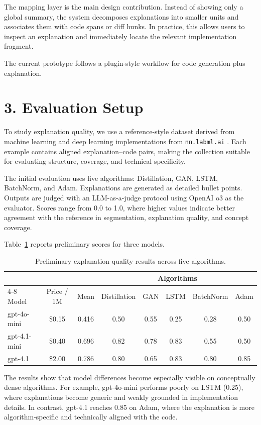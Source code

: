 \documentclass[11pt]{article}
\begin{document}
The mapping layer is the main design contribution. Instead of showing only a global summary, the system decomposes explanations into smaller units and associates them with code spans or diff hunks. In practice, this allows users to inspect an explanation and immediately locate the relevant implementation fragment.

The current prototype follows a plugin-style workflow for code generation plus explanation.

\section*{3. Evaluation Setup}
To study explanation quality, we use a reference-style dataset derived from machine learning and deep learning implementations from \texttt{nn.labml.ai} \cite{labml}. Each example contains aligned explanation--code pairs, making the collection suitable for evaluating structure, coverage, and technical specificity.

The initial evaluation uses five algorithms: Distillation, GAN, LSTM, BatchNorm, and Adam. Explanations are generated as detailed bullet points. Outputs are judged with an LLM-as-a-judge protocol using OpenAI o3 as the evaluator. Scores range from 0.0 to 1.0, where higher values indicate better agreement with the reference in segmentation, explanation quality, and concept coverage.

Table~\ref{tab:results} reports preliminary scores for three models.

\begin{table}[h]
\centering
\scriptsize
\begin{tabular}{lccccccc}
\toprule
& & & \multicolumn{5}{c}{Algorithms} \\
\cmidrule(lr){4-8}
Model & Price / 1M & Mean & Distillation & GAN & LSTM & BatchNorm & Adam \\
\midrule
gpt-4o-mini  & \$0.15 & 0.416 & 0.50 & 0.55 & 0.25 & 0.28 & 0.50 \\
gpt-4.1-mini & \$0.40 & 0.696 & 0.82 & 0.78 & 0.83 & 0.55 & 0.50 \\
gpt-4.1      & \$2.00 & 0.786 & 0.80 & 0.65 & 0.83 & 0.80 & 0.85 \\
\bottomrule
\end{tabular}
\caption{Preliminary explanation-quality results across five algorithms.}
\label{tab:results}
\end{table}

The results show that model differences become especially visible on conceptually dense algorithms. For example, gpt-4o-mini performs poorly on LSTM (0.25), where explanations become generic and weakly grounded in implementation details. In contrast, gpt-4.1 reaches 0.85 on Adam, where the explanation is more algorithm-specific and technically aligned with the code.
\end{document}
